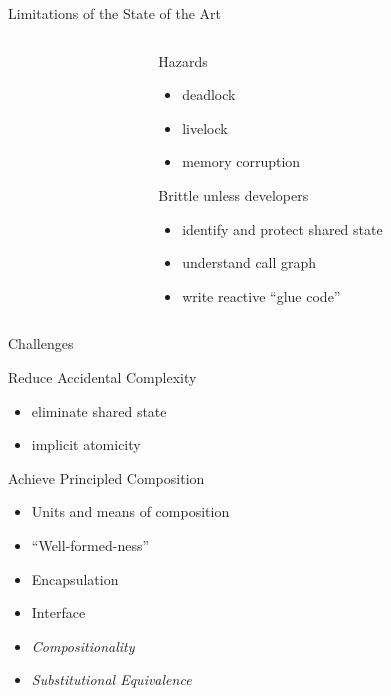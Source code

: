 \documentclass{beamer}
\begin{document}
\begin{frame}{Limitations of the State of the Art}
\begin{columns}
\begin{column}{.6\textwidth}
{\begin{tikzpicture}
        \end{tikzpicture}
      }
    \end{column}

    \begin{column}{.4\textwidth}
      \begin{block}{Hazards}
        \begin{itemize}
          \item deadlock
          \item livelock
          \item memory corruption
        \end{itemize}
      \end{block}
      \begin{block}{Brittle unless developers}
        \begin{itemize}
        \item identify and protect shared state
        \item understand call graph
        \item write reactive ``glue code''
        \end{itemize}
      \end{block}

    \end{column}
  \end{columns}

\end{frame}

\begin{frame}{Challenges}
  \centering

  \begin{block}{Reduce Accidental Complexity}
    \begin{itemize}
    \item eliminate shared state
    \item implicit atomicity
    \end{itemize}
  \end{block}

  \begin{block}{Achieve Principled Composition}
    \begin{itemize}
    \item Units and means of composition
    \item ``Well-formed-ness''
    \item Encapsulation
    \item Interface
    \item \emph{Compositionality}
    \item \emph{Substitutional Equivalence}
    \end{itemize}
  \end{block}
\end{frame}
\end{document}
